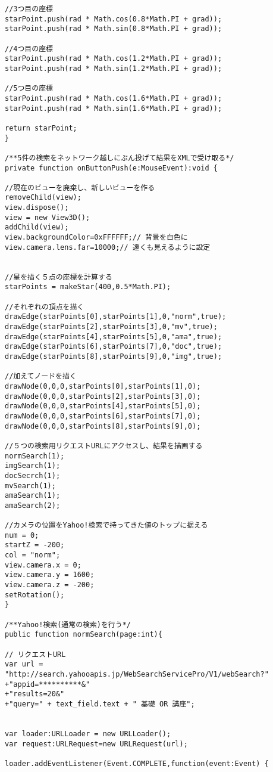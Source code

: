 {\begin{verbatim}
//3つ目の座標
starPoint.push(rad * Math.cos(0.8*Math.PI + grad));
starPoint.push(rad * Math.sin(0.8*Math.PI + grad));

//4つ目の座標
starPoint.push(rad * Math.cos(1.2*Math.PI + grad));
starPoint.push(rad * Math.sin(1.2*Math.PI + grad));

//5つ目の座標
starPoint.push(rad * Math.cos(1.6*Math.PI + grad));
starPoint.push(rad * Math.sin(1.6*Math.PI + grad));

return starPoint;
}

/**5件の検索をネットワーク越しにぶん投げて結果をXMLで受け取る*/
private function onButtonPush(e:MouseEvent):void {

//現在のビューを廃棄し、新しいビューを作る
removeChild(view);
view.dispose();
view = new View3D();
addChild(view);
view.backgroundColor=0xFFFFFF;// 背景を白色に
view.camera.lens.far=10000;// 遠くも見えるように設定


//星を描く５点の座標を計算する
starPoints = makeStar(400,0.5*Math.PI);

//それぞれの頂点を描く
drawEdge(starPoints[0],starPoints[1],0,"norm",true);
drawEdge(starPoints[2],starPoints[3],0,"mv",true);
drawEdge(starPoints[4],starPoints[5],0,"ama",true);
drawEdge(starPoints[6],starPoints[7],0,"doc",true);
drawEdge(starPoints[8],starPoints[9],0,"img",true);

//加えてノードを描く
drawNode(0,0,0,starPoints[0],starPoints[1],0);
drawNode(0,0,0,starPoints[2],starPoints[3],0);
drawNode(0,0,0,starPoints[4],starPoints[5],0);
drawNode(0,0,0,starPoints[6],starPoints[7],0);
drawNode(0,0,0,starPoints[8],starPoints[9],0);

//５つの検索用リクエストURLにアクセスし、結果を描画する
normSearch(1);
imgSearch(1);
docSecrch(1);
mvSearch(1);
amaSearch(1);
amaSearch(2);

//カメラの位置をYahoo!検索で持ってきた値のトップに据える
num = 0;
startZ = -200;
col = "norm";
view.camera.x = 0;
view.camera.y = 1600;
view.camera.z = -200;
setRotation();
}

/**Yahoo!検索(通常の検索)を行う*/
public function normSearch(page:int){

// リクエストURL
var url = "http://search.yahooapis.jp/WebSearchServicePro/V1/webSearch?"
+"appid=**********&"
+"results=20&"
+"query=" + text_field.text + " 基礎 OR 講座";


var loader:URLLoader = new URLLoader();
var request:URLRequest=new URLRequest(url);

loader.addEventListener(Event.COMPLETE,function(event:Event) {


\end{verbatim}}
